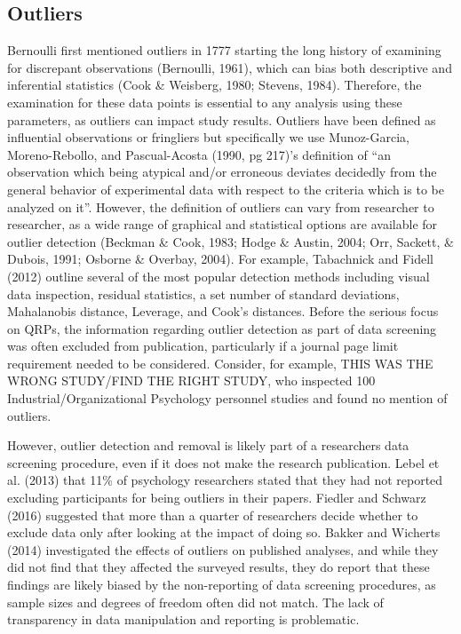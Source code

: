 \documentclass[english,man]{apa6}
\theoremstyle{definition}
\theoremstyle{definition}
\theoremstyle{definition}
\theoremstyle{remark}
\begin{document}
\subsection{Outliers}\label{outliers}

Bernoulli first mentioned outliers in 1777 starting the long history of
examining for discrepant observations (Bernoulli, 1961), which can bias
both descriptive and inferential statistics (Cook \& Weisberg, 1980;
Stevens, 1984). Therefore, the examination for these data points is
essential to any analysis using these parameters, as outliers can impact
study results. Outliers have been defined as influential observations or
fringliers but specifically we use Munoz-Garcia, Moreno-Rebollo, and
Pascual-Acosta (1990, pg 217)'s definition of \enquote{an observation
which being atypical and/or erroneous deviates decidedly from the
general behavior of experimental data with respect to the criteria which
is to be analyzed on it}. However, the definition of outliers can vary
from researcher to researcher, as a wide range of graphical and
statistical options are available for outlier detection (Beckman \&
Cook, 1983; Hodge \& Austin, 2004; Orr, Sackett, \& Dubois, 1991;
Osborne \& Overbay, 2004). For example, Tabachnick and Fidell (2012)
outline several of the most popular detection methods including visual
data inspection, residual statistics, a set number of standard
deviations, Mahalanobis distance, Leverage, and Cook's distances. Before
the serious focus on QRPs, the information regarding outlier detection
as part of data screening was often excluded from publication,
particularly if a journal page limit requirement needed to be
considered. Consider, for example, THIS WAS THE WRONG STUDY/FIND THE
RIGHT STUDY, who inspected 100 Industrial/Organizational Psychology
personnel studies and found no mention of outliers.

However, outlier detection and removal is likely part of a researchers
data screening procedure, even if it does not make the research
publication. Lebel et al. (2013) that 11\% of psychology researchers
stated that they had not reported excluding participants for being
outliers in their papers. Fiedler and Schwarz (2016) suggested that more
than a quarter of researchers decide whether to exclude data only after
looking at the impact of doing so. Bakker and Wicherts (2014)
investigated the effects of outliers on published analyses, and while
they did not find that they affected the surveyed results, they do
report that these findings are likely biased by the non-reporting of
data screening procedures, as sample sizes and degrees of freedom often
did not match. The lack of transparency in data manipulation and
reporting is problematic.
\end{document}
